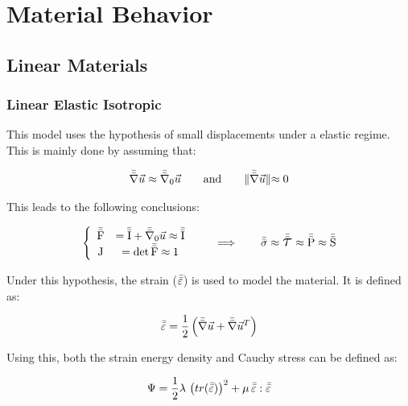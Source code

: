 \chapter{Material Behavior}

\section{Linear Materials} \label{sec:lin_mat}

\subsection{Linear Elastic Isotropic} \label{mat:linear_elastic_iso}

This model uses the hypothesis of small displacements under a elastic regime. This is mainly done by assuming that:

\begin{equation} \label{eq:small_disp}
    \bar{\bar{\nabla}} \vec{u} \approx \bar{\bar{\nabla}}_\mathrm{0} \vec{u} \qquad \text{and} \qquad \lVert  \bar{\bar{\nabla}} \vec{u} \lVert \approx 0
\end{equation}

This leads to the following conclusions:

\begin{equation*}
    \left\{
    \begin{array}{cc}
        \F &= \tensorTwo{\mathrm{I}} + \tensorTwoGradO{\vec{u}} \approx \tensorTwo{\mathrm{I}} \\
        \J &= \det{\F} \approx 1 \\
    \end{array} \right.
    \qquad \Longrightarrow \qquad \cauchy \approx \kirchhoff \approx \pkOne \approx \pkTwo
\end{equation*}

Under this hypothesis, the strain ($\bar{\bar{\varepsilon}}$) is used to model the material. It is defined as:

\begin{equation} \label{eq:strain}
    \bar{\bar{\varepsilon}} = \frac{1}{2} \left(\bar{\bar{\nabla}} \vec{u} + \bar{\bar{\nabla}} \vec{u}^T \right)
\end{equation}

Using this, both the strain energy density and Cauchy stress can be defined as:

\begin{equation} \label{eq:psi_linear_elastic_iso}
    \Psi = \frac{1}{2} \lambda \, \left( tr(\bar{\bar{\varepsilon}}) \right)^2 + \mu \, \bar{\bar{\varepsilon}} : \bar{\bar{\varepsilon}}
\end{equation}

